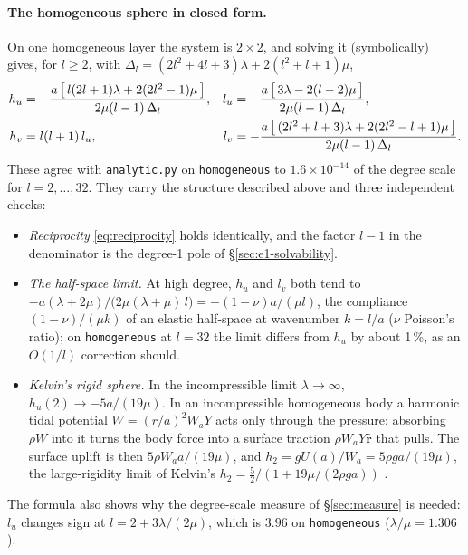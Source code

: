 \documentclass[11pt]{article}
\numberwithin{equation}{section}
\newcommand{\rhat}{\hat{\mathbf{r}}}
\newcommand{\code}[1]{\texttt{#1}}
\begin{document}
\paragraph{The homogeneous sphere in closed form.}
\label{sec:e1-closed}
On one homogeneous layer the system is $2\times2$, and solving it
(symbolically) gives, for $l\ge2$, with
$\Delta_l = (2l^2+4l+3)\lambda + 2(l^2+l+1)\mu$,
\begin{align}
  h_u &= -\frac{a\,\bigl[\,l(2l+1)\lambda + 2(2l^2-1)\mu\,\bigr]}{2\mu(l-1)\,\Delta_l},
  &
  l_u &= -\frac{a\,\bigl[\,3\lambda - 2(l-2)\mu\,\bigr]}{2\mu(l-1)\,\Delta_l},
  \notag\\
  h_v &= l(l+1)\,l_u,
  &
  l_v &= -\frac{a\,\bigl[\,(2l^2+l+3)\lambda + 2(2l^2-l+1)\mu\,\bigr]}{2\mu(l-1)\,\Delta_l}.
  \label{eq:closed}
\end{align}
These agree with \code{analytic.py} on \code{homogeneous} to
$1.6\times10^{-14}$ of the degree scale for $l=2,\dots,32$. They carry the
structure described above and three independent checks:
\begin{itemize}[leftmargin=*]
\item \emph{Reciprocity} \eqref{eq:reciprocity} holds identically, and
  the factor $l-1$ in the denominator is the degree-1 pole of
  \S\ref{sec:e1-solvability}.
\item \emph{The half-space limit.} At high degree, $h_u$ and $l_v$ both
  tend to $-a(\lambda+2\mu)/\bigl(2\mu(\lambda+\mu)\,l\bigr) =
  -(1-\nu)a/(\mu l)$, the compliance $(1-\nu)/(\mu k)$ of an elastic
  half-space at wavenumber $k=l/a$ ($\nu$ Poisson's ratio); on
  \code{homogeneous} at $l=32$ the limit differs from $h_u$ by about
  1\,\%, as an $O(1/l)$ correction should.
\item \emph{Kelvin's rigid sphere.} In the incompressible limit
  $\lambda\to\infty$, $h_u(2)\to -5a/(19\mu)$. In an incompressible
  homogeneous body a harmonic tidal potential $W=(r/a)^2W_aY$ acts only
  through the pressure: absorbing $\rho W$ into it turns the body force into
  a surface traction $\rho W_a Y\rhat$ that pulls. The surface uplift is then
  $5\rho W_a a/(19\mu)$, and $h_2 = gU(a)/W_a = 5\rho g a/(19\mu)$, the
  large-rigidity limit of Kelvin's $h_2 = \tfrac52/(1+19\mu/(2\rho g a))$
  \cite{Love1927}.
\end{itemize}
The formula also shows why the degree-scale measure of
\S\ref{sec:measure} is needed: $l_u$ changes sign at
$l = 2+3\lambda/(2\mu)$, which is $3.96$ on \code{homogeneous}
($\lambda/\mu=1.306$).
\end{document}
